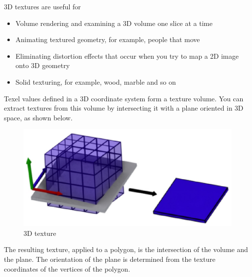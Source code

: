 3D textures are useful for

\begin{itemize}
\item{Volume rendering and examining a 3D volume one slice at a time}
\item{Animating textured geometry, for example, people that move}
\item{Eliminating distortion effects that occur when you try to map a 2D image onto 3D geometry}
\item{Solid texturing, for example, wood, marble and so on}
\end{itemize}

Texel values defined in a 3D coordinate system form a texture volume. You can extract textures from this volume by intersecting it with a plane oriented in 3D space, as shown below.

\begin{figure}
  \begin{center}
    \includegraphics{pics/3DTex_2.eps}
  \end{center}
  \caption{3D texture}
  \label{fig:Extracting a Planar Texture From a 3D Texture Volume}
\end{figure}

The resulting texture, applied to a polygon, is the intersection of the volume and the plane. The orientation of the plane is determined from the texture coordinates of the vertices of the polygon.
